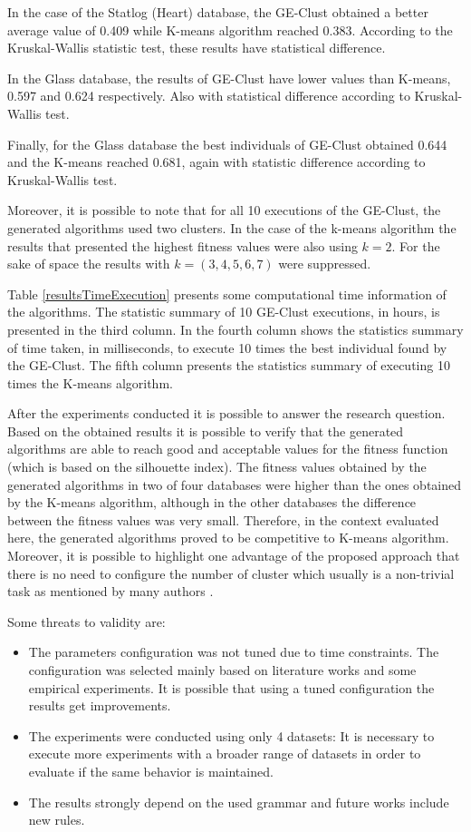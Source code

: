 \documentclass[journal]{IEEEtran}
\begin{document}
	In the case of the Statlog (Heart) database,  the GE-Clust obtained a better average value of 0.409 while K-means algorithm reached 0.383. According to the  Kruskal-Wallis statistic test, these results have statistical difference.
	
	In the Glass database, the results of GE-Clust have lower values than K-means, 0.597 and 0.624 respectively. Also with statistical difference according to Kruskal- Wallis test. 
	
	Finally, for the Glass database the best individuals of GE-Clust obtained 0.644 and the K-means reached 0.681, again with statistic difference according to Kruskal-Wallis test.
	
	Moreover, it is possible to note that for all 10 executions of the GE-Clust, the generated algorithms used two clusters. In the case of the k-means algorithm the results that presented the highest fitness values were also using $k=2$. For the sake of space the results with $k = (3,4,5,6,7)$ were suppressed.
	
	Table \ref{resultsTimeExecution} presents some computational time information of the algorithms. The statistic summary of 10 GE-Clust executions, in hours, is presented in the third column. In the fourth column shows the statistics summary of time taken, in milliseconds, to execute 10 times the best individual found by the GE-Clust. The fifth column presents the statistics summary of executing 10 times the K-means algorithm.
	
	After the experiments conducted it is possible to answer the research question. Based on the obtained results it is possible to verify that the generated algorithms are able to reach good and acceptable values for the fitness function (which is based on the silhouette index). The fitness values obtained by the generated algorithms in two of four databases were higher than the ones obtained by the K-means algorithm, although in the other databases the difference between the fitness values was very small. Therefore, in the context evaluated here, the generated algorithms proved to be competitive to K-means algorithm. Moreover, it is possible to highlight one advantage of the proposed approach that there is no need to configure the number of cluster which usually is a non-trivial task as mentioned by many authors \cite{pham2005selection, yan2005methods, tibshirani2001estimating}.
	
	Some threats to validity are:
	\begin{itemize}
		\item The parameters configuration was not tuned due to time constraints. The configuration was selected mainly based on literature works and some empirical experiments. It is possible that using a tuned configuration the results get improvements.
		\item The experiments were conducted using only 4 datasets: It is necessary to execute more experiments with a broader range of datasets in order to evaluate if the same behavior is maintained.
		\item The results strongly depend on the used grammar and future works include new rules.
	\end{itemize}
	
\end{document}
